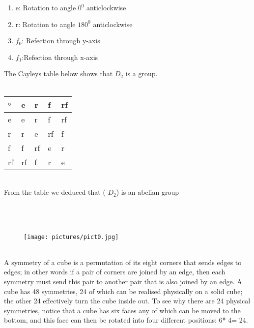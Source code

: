 \documentclass{article}
\begin{document}
\begin{enumerate}
\item{e: Rotation to angle $0^0$ anticlockwise}

\vspace{4cm}
\item{r: Rotation to angle $180^0$ anticlockwise}


\item{$f_0$: Refection through y-axis }


\item{$f_1$:Refection through x-axis  }

\end{enumerate}
\vspace{4cm}
The Cayleys table below shows that $D_2$ is a group.\\\\

\begin{tabular}{| l | l | l | l |l |}
\hline
$\circ$& e& r & f & rf \\
\hline
e& e& r & f & rf \\
\hline
r& r& e & rf & f\\ 
\hline
f& f& rf& e & r \\
\hline
rf& rf&f &r & e \\
\hline
\end{tabular}\\

From the table we deduced that ( $D_2$) is an abelian group\\\\

\\\\
\begin{figure}[htp]
    \texttt{[image: pictures/pict0.jpg]}
\end{figure}\\
A symmetry of a cube is a permutation of its eight corners that sends edges to edges; in other words if a pair of corners are joined by an edge, then each symmetry must send this pair to another pair that is also joined by an edge. A cube has 48 symmetries, 24 of which can be realised physically  on a solid cube; the other 24 effectively turn the cube inside out. To see why there are 24 physical symmetries, notice that a cube has six faces any of which can be moved to the bottom, and this face can then be rotated into four different positions: 6* 4= 24.\\
\end{document}
